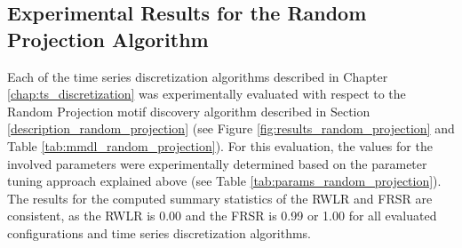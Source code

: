 \subsection*{Experimental Results for the Random Projection Algorithm}
Each of the time series discretization algorithms described in Chapter \ref{chap:ts_discretization} was experimentally evaluated with respect to the Random Projection motif discovery algorithm described in Section \ref{description_random_projection} (see Figure \ref{fig:results_random_projection} and Table \ref{tab:mmdl_random_projection}). For this evaluation, the values for the involved parameters were experimentally determined based on the parameter tuning approach explained above (see Table \ref{tab:params_random_projection}). \newline
The results for the computed summary statistics of the \ac{RWLR} and \ac{FRSR} are consistent, as the \ac{RWLR} is 0.00 and the \ac{FRSR} is 0.99 or 1.00 for all evaluated configurations and time series discretization algorithms.
\newpage
